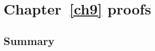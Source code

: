 \chapter{Chapter~\ref{ch9} proofs}

\newpage
\section{Summary}\label{ch9.ps.summary}
\lpscriptsummary
